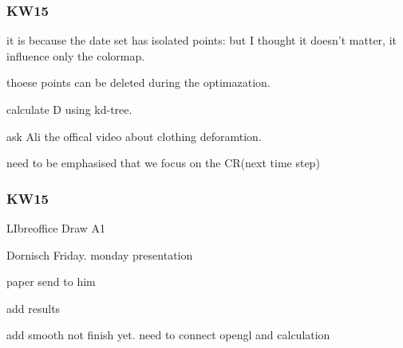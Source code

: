 \documentclass{beamer}
\begin{document}

\begin{frame}
\frametitle{KW15}
it is because the date set has isolated points: but I thought it doesn't matter, it influence only the colormap.

thoese points can be deleted during the optimazation.

calculate D using kd-tree.

ask Ali the offical video about clothing deforamtion.

need to be emphasised that we focus on the CR(next time step)
\end{frame}

\begin{frame}
\frametitle{KW15}
LIbreoffice Draw A1

Dornisch Friday. monday presentation

paper send to him

add results

add smooth not finish yet. need to connect opengl and calculation
\end{frame}
\end{document}
